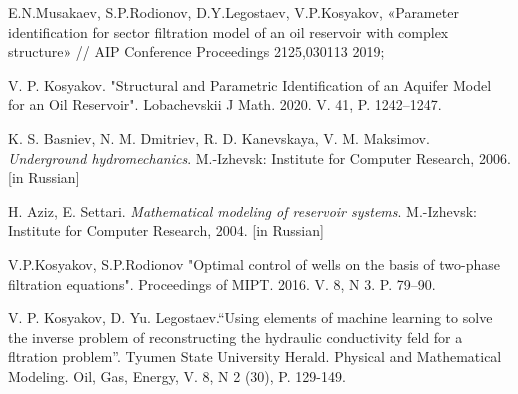 \documentclass{article}
\begin{document}
%
%
\begin{thebibliography}{99}
 E.N.Musakaev, S.P.Rodionov, D.Y.Legostaev, V.P.Kosyakov,  «Parameter identification for sector filtration model of an oil reservoir with complex structure» // AIP Conference Proceedings 2125,030113 2019;

 V. P. Kosyakov. "Structural and Parametric Identification of an Aquifer Model for an Oil Reservoir". Lobachevskii J Math. 2020. V. 41, P. 1242–1247.

 K. S. Basniev, N. M. Dmitriev, R. D. Kanevskaya, V. M. Maksimov. \textit{Underground hydromechanics}. M.-Izhevsk: Institute for Computer Research, 2006. [in Russian]

 H. Aziz, E. Settari. \textit{Mathematical modeling of reservoir systems}.  M.-Izhevsk: Institute for Computer Research, 2004. [in Russian]

 V.P.Kosyakov, S.P.Rodionov "Optimal control of wells on the basis of two-phase filtration equations". Proceedings of MIPT. 2016. V. 8, N 3. P. 79–90.

 V. P. Kosyakov,  D. Yu. Legostaev.“Using elements of machine learning to
solve the inverse problem of reconstructing the hydraulic conductivity feld for a fltration
problem”. Tyumen State University Herald. Physical and Mathematical Modeling. Oil, Gas,
Energy, V. 8, N 2 (30), P. 129-149.

\end{thebibliography}
\end{document}
